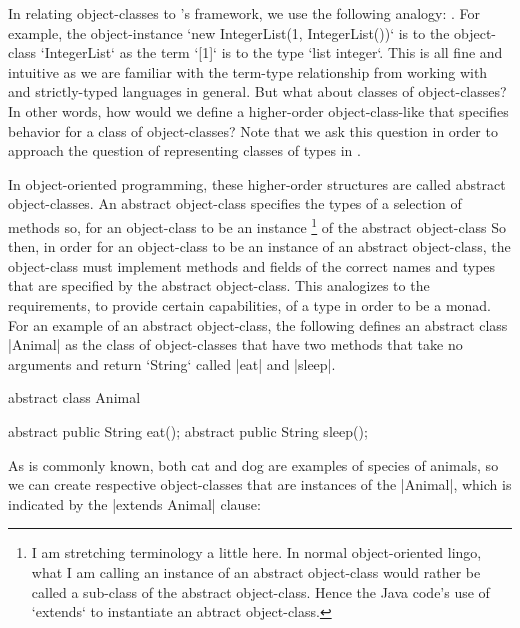 In relating object-classes to \LangA's framework, we use the following analogy:
.
For example,
the object-instance \code`new IntegerList(1, IntegerList())` is to
the object-class \code`IntegerList` as
the term \code`[1]` is to
the type \code`list integer`.
This is all fine and intuitive as we are familiar with the term-type relationship from working with \LangA and strictly-typed languages in general.
But what about classes of object-classes?
In other words, how would we define a higher-order object-class-like that specifies behavior for a class of object-classes?
Note that we ask this question in order to approach the question of representing classes of types in \LangA.

In object-oriented programming, these higher-order structures are called abstract object-classes.
An abstract object-class specifies the types of a selection of methods so,
for an object-class to be an instance%
\footnote{
  I am stretching terminology a little here.
  In normal object-oriented lingo, what I am calling an instance of an abstract object-class would rather be called a sub-class of the abstract object-class.
  Hence the Java code's use of \code`extends` to instantiate an abtract object-class.
}
of the abstract object-class
So then, in order for an object-class to be an instance of an abstract object-class, the object-class must implement methods and fields of the correct names and types that are specified by the abstract object-class.
This analogizes to the requirements, to provide certain capabilities, of a type in order to be a monad.
For an example of an abstract object-class, the following defines an abstract class \code|Animal| as the class of object-classes that have two methods that take no arguments and return \code`String` called \code|eat| and \code|sleep|.
\begin{snippet-Java}
abstract class Animal {

  abstract public String eat();
  abstract public String sleep();

}
\end{snippet-Java}
As is commonly known, both cat and dog are examples of species of animals, so we can create respective object-classes that are instances of the \code|Animal|, which is indicated by the \code|extends Animal| clause:
